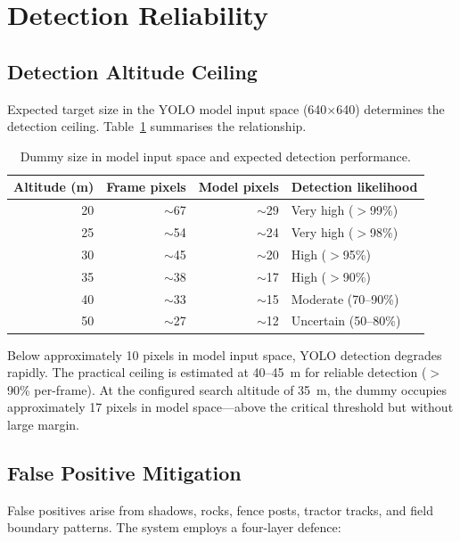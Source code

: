 \section{Detection Reliability}
\label{sec:detection-reliability}

\subsection{Detection Altitude Ceiling}

Expected target size in the YOLO model input space (640$\times$640) determines
the detection ceiling. Table~\ref{tab:altitude-detection} summarises the relationship.

\begin{table}[htbp]
\centering
\caption{Dummy size in model input space and expected detection performance.}
\label{tab:altitude-detection}
\begin{tabular}{rrrp{4cm}}
\hline
\textbf{Altitude (m)} & \textbf{Frame pixels} & \textbf{Model pixels} &
\textbf{Detection likelihood} \\
\hline
20 & $\sim$67 & $\sim$29 & Very high ($>$99\%) \\
25 & $\sim$54 & $\sim$24 & Very high ($>$98\%) \\
30 & $\sim$45 & $\sim$20 & High ($>$95\%) \\
35 & $\sim$38 & $\sim$17 & High ($>$90\%) \\
40 & $\sim$33 & $\sim$15 & Moderate (70--90\%) \\
50 & $\sim$27 & $\sim$12 & Uncertain (50--80\%) \\
\hline
\end{tabular}
\end{table}

Below approximately 10 pixels in model input space, YOLO detection degrades rapidly.
The practical ceiling is estimated at 40--45~m for reliable detection ($>$90\%
per-frame). At the configured search altitude of 35~m, the dummy occupies
approximately 17 pixels in model space---above the critical threshold but without
large margin.

\subsection{False Positive Mitigation}

False positives arise from shadows, rocks, fence posts, tractor tracks, and field
boundary patterns. The system employs a four-layer defence:


